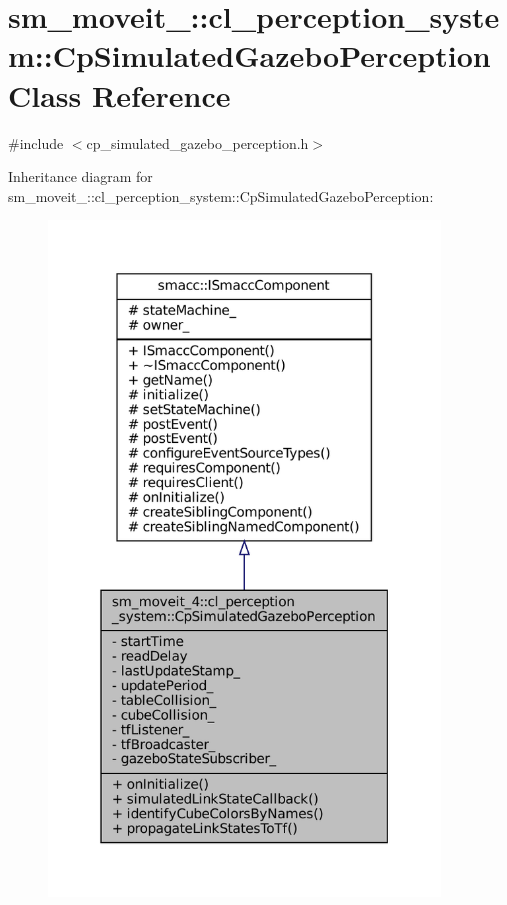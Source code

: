 \hypertarget{classsm__moveit__4_1_1cl__perception__system_1_1CpSimulatedGazeboPerception}{}\section{sm\+\_\+moveit\+\_\+:\+:cl\+\_\+perception\+\_\+system\+:\+:Cp\+Simulated\+Gazebo\+Perception Class Reference}
\label{classsm__moveit__4_1_1cl__perception__system_1_1CpSimulatedGazeboPerception}


{\ttfamily \#include $<$cp\+\_\+simulated\+\_\+gazebo\+\_\+perception.\+h$>$}



Inheritance diagram for sm\+\_\+moveit\+\_\+:\+:cl\+\_\+perception\+\_\+system\+:\+:Cp\+Simulated\+Gazebo\+Perception\+:
\nopagebreak
\begin{figure}[H]
\begin{center}
\leavevmode
\includegraphics[width=295pt]{classsm__moveit__4_1_1cl__perception__system_1_1CpSimulatedGazeboPerception__inherit__graph}
\end{center}
\end{figure}


